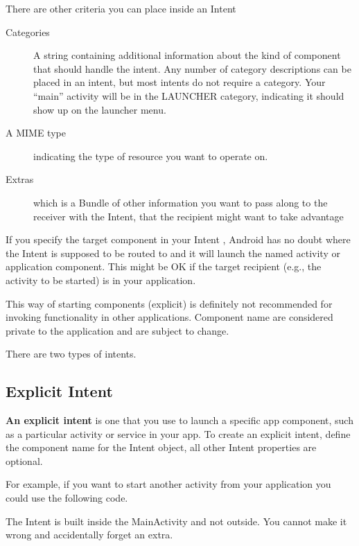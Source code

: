 There are other criteria you can place inside an Intent
\begin{description}
	\item[Categories] A string containing additional information about the kind of component that should handle the intent. Any number of category descriptions can be placed in an intent, but most intents do not require a category. Your “main” activity will be in the LAUNCHER category, indicating it should show up on the launcher menu.
	\item[A MIME type]  indicating the type of resource you want to operate on.
	\item[Extras] which is a Bundle of other information you want to pass along to the receiver with the Intent, that the recipient might want to take advantage
\end{description}

If you specify the target component in your Intent , Android has no doubt where the Intent is supposed to be routed to and it will launch the named activity or application component. This might be OK if the target recipient (e.g., the activity to be started) is in your application.

\begin{framed}
		This way of starting components (explicit) is definitely  not recommended for invoking functionality in
		other applications. Component name are considered private to the application and are subject to change.
\end{framed}

There are two types of intents.


\subsection{Explicit Intent}
\textbf{An explicit intent} is one that you use to launch a specific app component, such as a particular activity or service in your app. To create an explicit intent, define the component name for the Intent object, all other Intent properties are optional.

For example, if you want to start another activity from your application you could use the following code. 



The Intent is built inside the MainActivity and not outside. You cannot make it wrong and accidentally forget an extra. 

